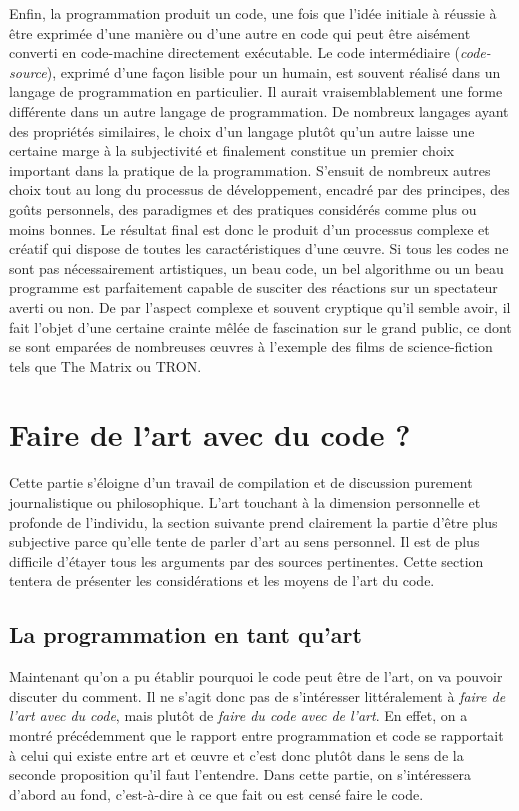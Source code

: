 \documentclass[12pt]{article} %
\begin{document}
Enfin, la programmation produit un code, une fois que l'idée initiale à réussie à être exprimée d'une manière ou d'une autre en code qui peut être aisément converti en code-machine directement exécutable. Le code intermédiaire (\textit{code-source}), exprimé d'une façon lisible pour un humain, est souvent réalisé dans un langage de programmation en particulier. Il aurait vraisemblablement une forme différente dans un autre langage de programmation. De nombreux langages ayant des propriétés similaires, le choix d'un langage plutôt qu'un autre laisse une certaine marge à la subjectivité et finalement constitue un premier choix important dans la pratique de la programmation. S'ensuit de nombreux autres choix tout au long du processus de développement, encadré par des principes, des goûts personnels, des paradigmes et des pratiques considérés comme plus ou moins bonnes. Le résultat final est donc le produit d'un processus complexe et créatif qui dispose de toutes les caractéristiques d'une œuvre. Si tous les codes ne sont pas nécessairement artistiques, un beau code, un bel algorithme ou un beau programme est parfaitement capable de susciter des réactions sur un spectateur averti ou non. De par l'aspect complexe et souvent cryptique qu'il semble avoir, il fait l'objet d'une certaine crainte mêlée de fascination sur le grand public, ce dont se sont emparées de nombreuses œuvres à l'exemple des films de science-fiction tels que The Matrix ou TRON.

\section{Faire de l'art avec du code ?}
Cette partie s'éloigne d'un travail de compilation et de discussion purement journalistique ou philosophique. L'art touchant à la dimension personnelle et profonde de l'individu, la section suivante prend clairement la partie d'être plus subjective parce qu'elle tente de parler d'art au sens personnel. Il est de plus difficile d'étayer tous les arguments par des sources pertinentes. Cette section tentera de présenter les considérations et les moyens de l'art du code. 

\subsection{La programmation en tant qu'art} %
Maintenant qu'on a pu établir pourquoi le code peut être de l'art, on va pouvoir discuter du comment. Il ne s'agit donc pas de s'intéresser littéralement à \textit{faire de l'art avec du code}, mais plutôt de \textit{faire du code avec de l'art}. En effet, on a montré précédemment que le rapport entre programmation et code se rapportait à celui qui existe entre art et œuvre et c'est donc plutôt dans le sens de la seconde proposition qu'il faut l'entendre. Dans cette partie, on s'intéressera d'abord au fond, c'est-à-dire à ce que fait ou est censé faire le code. 
\end{document}
